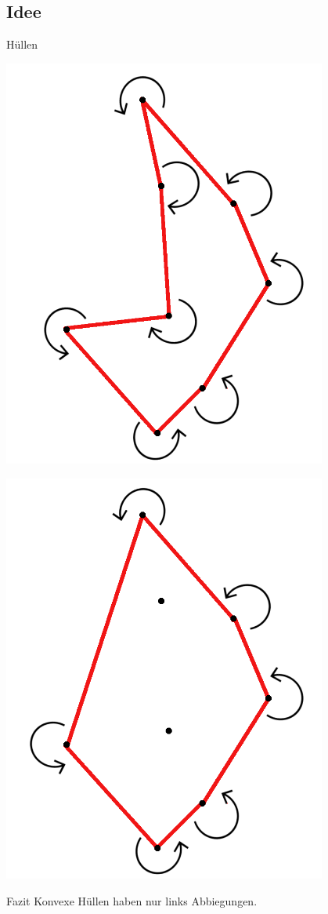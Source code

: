 \documentclass[18pt]{beamer}
\begin{document}
	\subsection{Idee}
		\begin{frame}{Hüllen}
			\begin{minipage}[t]{0.45\textwidth}
				\includegraphics[width=0.8\textwidth]{logos/nKonvex.png}
			\end{minipage}
			\begin{minipage}[t]{0.45\textwidth}
				\includegraphics[width=0.8\textwidth]{logos/konvex.png}
			\end{minipage}
			\begin{block}{Fazit}
				Konvexe Hüllen haben nur links Abbiegungen.
			\end{block}
		
		\end{frame}
\end{document}
